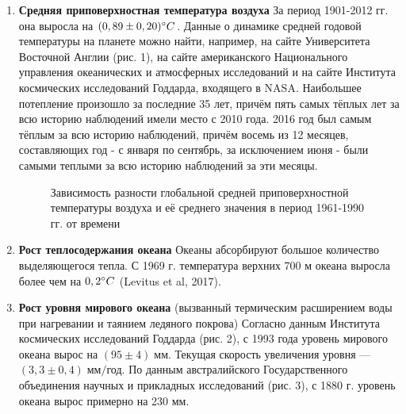 \documentclass[a4paper,14pt]{article}
\begin{document}
\begin{enumerate}

\item \textbf{Средняя приповерхностная температура воздуха}
\newline
За период 1901-2012 гг. она выросла на $(0,89 \pm 0,20) \degree C$. Данные о динамике средней годовой температуры на планете можно найти, например, на сайте Университета Восточной Англии (рис. 1), на сайте американского Национального управления океанических и атмосферных исследований и на сайте Института космических исследований Годдарда, входящего в NASA. Наибольшее потепление произошло за последние 35 лет, причём пять самых тёплых лет за всю историю наблюдений имели место с 2010 года. 2016 год был самым тёплым за всю историю наблюдений, причём восемь из 12 месяцев, составляющих год - с января по сентябрь, за исключением июня - были самыми теплыми за всю историю наблюдений за эти месяцы.

\begin{figure}[h!]
\caption{Зависимость разности глобальной средней приповерхностной температуры воздуха и её среднего значения в период 1961-1990 гг. от времени}
\end{figure}

\item \textbf{Рост теплосодержания океана}
\newline
Океаны абсорбируют большое количество выделяющегося тепла. С 1969 г. температура верхних 700 м океана выросла более чем на $0,2 \degree C$ (Levitus et al, 2017).

\item \textbf{Рост уровня мирового океана} (вызванный термическим расширением воды при нагревании и таянием ледяного покрова)
\newline
Согласно данным Института космических исследований Годдарда (рис. 2), с 1993 года уровень мирового океана вырос на $(95 \pm 4) \; \text{мм}$. Текущая скорость увеличения уровня --- $(3,3 \pm 0,4) \; \text{мм}/\text{год}$. По данным австралийского Государственного объединения научных и прикладных исследований (рис. 3), с 1880 г. уровень океана вырос примерно на 230 мм.


\end{enumerate}
\end{document}
